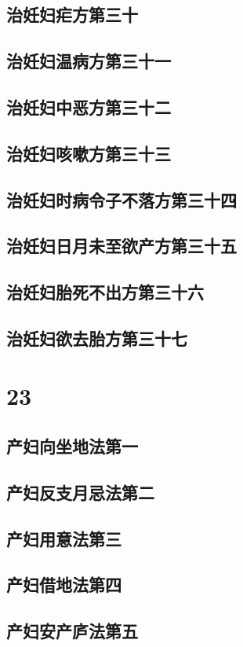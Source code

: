 \documentclass[a4paper,12pt,UTF8,twoside]{ctexbook}
\begin{document}
\chapter{治妊妇疟方第三十}
\chapter{治妊妇温病方第三十一}
\chapter{治妊妇中恶方第三十二}
\chapter{治妊妇咳嗽方第三十三}
\chapter{治妊妇时病令子不落方第三十四}
\chapter{治妊妇日月未至欲产方第三十五}
\chapter{治妊妇胎死不出方第三十六}
\chapter{治妊妇欲去胎方第三十七}

\part{23}
\chapter{产妇向坐地法第一}
\chapter{产妇反支月忌法第二}
\chapter{产妇用意法第三}
\chapter{产妇借地法第四}
\chapter{产妇安产庐法第五}
\end{document}
